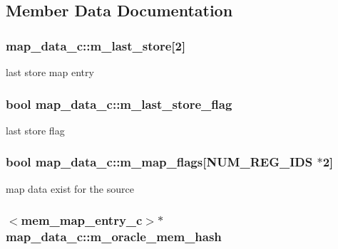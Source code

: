 \subsection{Member Data Documentation}
\hypertarget{classmap__data__c_a0fdc6d2ec6990c2dcf5851280020453f}{
\subsubsection[{m\_\-last\_\-store}]{ {\bf map\_\-data\_\-c::m\_\-last\_\-store}\mbox{[}2\mbox{]}}}
\label{classmap__data__c_a0fdc6d2ec6990c2dcf5851280020453f}
last store map entry \hypertarget{classmap__data__c_a43198f297f11ac7c3626469abedc194f}{
\subsubsection[{m\_\-last\_\-store\_\-flag}]{\setlength{\rightskip}{0pt plus 5cm}bool {\bf map\_\-data\_\-c::m\_\-last\_\-store\_\-flag}}}
\label{classmap__data__c_a43198f297f11ac7c3626469abedc194f}
last store flag \hypertarget{classmap__data__c_a8ff9086064a196500af89171acf094f4}{
\subsubsection[{m\_\-map\_\-flags}]{\setlength{\rightskip}{0pt plus 5cm}bool {\bf map\_\-data\_\-c::m\_\-map\_\-flags}\mbox{[}NUM\_\-REG\_\-IDS $\ast$2\mbox{]}}}
\label{classmap__data__c_a8ff9086064a196500af89171acf094f4}
map data exist for the source \hypertarget{classmap__data__c_a48ae320988c5045e28f10321feae64f8}{
\subsubsection[{m\_\-oracle\_\-mem\_\-hash}]{$<${\bf mem\_\-map\_\-entry\_\-c}$>$$\ast$ {\bf map\_\-data\_\-c::m\_\-oracle\_\-mem\_\-hash}}}
